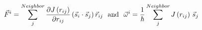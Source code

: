 \documentclass[preview]{standalone}
\begin{document}
\begin{varwidth}{50in}
  \begin{equation}
    \vec{F}^{i} = \sum_{j}^{Neighbor} \frac{\partial {J} \left(r_{ij} \right)}{
    \partial r_{ij}} \left( \vec{s}_{i}\cdot \vec{s}_{j} \right) \vec{r}_{ij}  
    ~~{\rm and}~~ \vec{\omega}^{i} = \frac{1}{\hbar} \sum_{j}^{Neighbor} {J} 
    \left(r_{ij} \right)\,\vec{s}_{j} \nonumber
  \end{equation}
\end{varwidth}
\end{document}
